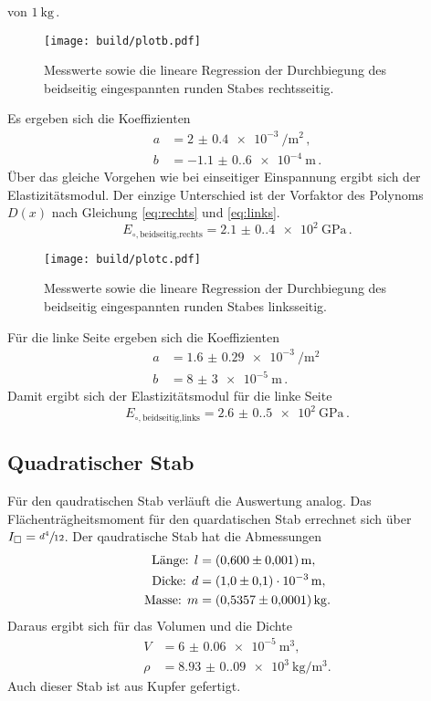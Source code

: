 von $\qty{1}{\kilo\gram}$\,. 
\begin{figure}[H]
    \centering
    \label{fig:plotb}
    \caption{Messwerte sowie die lineare Regression der Durchbiegung des beidseitig eingespannten runden Stabes rechtsseitig.}
    \texttt{[image: build/plotb.pdf]}
\end{figure}
Es ergeben sich die Koeffizienten 
\begin{align*}
    a&=\qty{2(0.4)e-3}{\per\meter\squared}\,,\\
    b&=\qty{-1.1(0.6)e-4}{\meter}\,.
\end{align*}
Über das gleiche Vorgehen wie bei einseitiger Einspannung ergibt sich der Elastizitätsmodul. Der einzige Unterschied ist 
der Vorfaktor des Polynoms $D(x)$ nach Gleichung \eqref{eq:rechts} und \eqref{eq:links}.
\begin{equation*}
E_{\circ,\text{beidseitig,rechts}}=\qty{2.1(0.4)e2}{\giga\pascal}\,.
\end{equation*}
\begin{figure}[H]
    \centering
    \label{fig:plotc}
    \caption{Messwerte sowie die lineare Regression der Durchbiegung des beidseitig eingespannten runden Stabes linksseitig.}
    \texttt{[image: build/plotc.pdf]}
\end{figure}
Für die linke Seite ergeben sich die Koeffizienten
\begin{align*}
    a&=\qty{1,6(0.29)e-3}{\per\meter\squared}\,\\
    b&=\qty{8(3)e-5}{\meter}\,.
\end{align*}
Damit ergibt sich der Elastizitätsmodul für die linke Seite
\begin{equation*}
    E_{\circ,\text{beidseitig,links}}=\qty{2.6(0.5)e2}{\giga\pascal}\,.
\end{equation*}
\subsection{Quadratischer Stab}
Für den qaudratischen Stab verläuft die Auswertung analog. Das Flächenträgheitsmoment für den quardatischen Stab errechnet sich
über $I_\square=\sfrac{d^4}{12}$. Der qaudratische Stab hat die Abmessungen 
\begin{align*}
    \text{Länge: } l&=\qty{0,6(0.001)}{\meter},\\
    \text{Dicke: } d&=\qty{1,0(0,1)e-3}{\meter},\\
    \text{Masse: } m&=\qty{0,5357(0.0001)}{\kilo\gram}.
\end{align*}
Daraus ergibt sich für das Volumen und die Dichte 
\begin{align*}
    V&=\qty{6(0.06)e-5}{\meter\cubed},\\
    \rho&=\qty{8.93(0.09)e3}{\kilo\gram\per\meter\cubed}.
\end{align*}
Auch dieser Stab ist aus Kupfer gefertigt.
